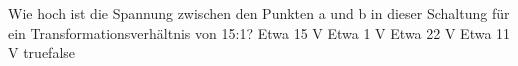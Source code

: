     {Wie hoch ist die Spannung zwischen den Punkten a und b in dieser Schaltung für ein Transformationsverhältnis von 15:1?}
    {Etwa 15 V}
    {Etwa 1 V}
    {Etwa 22 V}
    {Etwa 11 V}
    {true}{false}